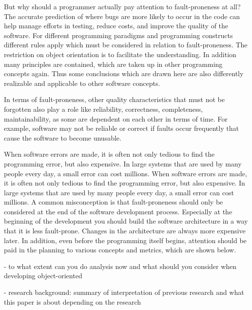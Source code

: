 But why should a programmer actually pay attention to fault-proneness at all? The accurate prediction of where bugs are more likely to occur in the code can help manage efforts in testing, reduce costs, and improve the quality of the software. For different programming paradigms and programming constructs different rules apply which must be considered in relation to fault-proneness.  The restriction on object orientation is to facilitate the understanding. In addition many principles are contained, which are taken up in other programming concepts again. Thus some conclusions which are drawn here are also differently realizable and applicable to other software concepts.

In terms of fault-proneness, other quality characteristics that must not be forgotten also play a role like reliability, correctness, completeness, maintainability, as some are dependent on each other in terms of time. For example, software may not be reliable or correct if faults occur frequently that cause the software to become unusable.

When software errors are made, it is often not only tedious to find the programming error, but also expensive. In large systems that are used by many people every day, a small error can cost millions. When software errors are made, it is often not only tedious to find the programming error, but also expensive. In large systems that are used by many people every day, a small error can cost millions. A common misconception is that fault-proneness should only be considered at the end of the software development process. Especially at the beginning of the development you should build the software architecture in a way that it is less fault-prone. Changes in the architecture are always more expensive later. In addition, even before the programming itself begins, attention should be paid in the planning to various concepts and metrics, which are shown below.

- to what extent can you do analysis now and what should you consider when developing object-oriented

- research background: summary of interpretation of previous research and what this paper is about depending on the research